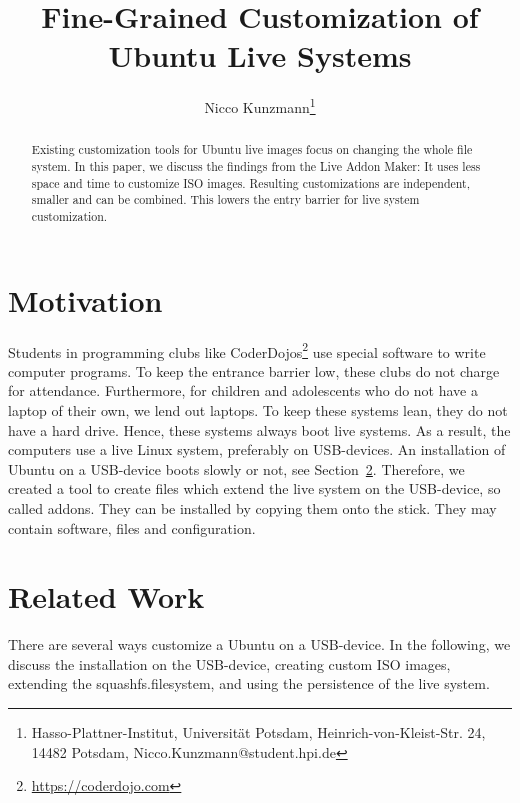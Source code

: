 \documentclass[english]{lni}
\author{Nicco Kunzmann\footnote{Hasso-Plattner-Institut, Universität Potsdam, Heinrich-von-Kleist-Str. 24, 14482 Potsdam, Nicco.Kunzmann@student.hpi.de} 
}
\title{Fine-Grained Customization of Ubuntu Live Systems}
\begin{document}
\maketitle
\renewcommand{\refname}{Literaturverzeichnis}
\setcounter{footnote}{2} %

\begin{abstract}
Existing customization tools for Ubuntu live images focus on changing the whole file system.
In this paper, we discuss the findings from the Live Addon Maker:
It uses less space and time to customize ISO images.
Resulting customizations are independent, smaller and can be combined.
This lowers the entry barrier for live system customization.
\end{abstract}
\begin{keywords}
\end{keywords}

\section{Motivation}

Students in programming clubs like CoderDojos\footnote{\url{https://coderdojo.com}} use special software to write computer programs.
To keep the entrance barrier low, these clubs do not charge for attendance.
Furthermore, for children and adolescents who do not have a laptop of their own, we lend out laptops. 
To keep these systems lean, they do not have a hard drive.
Hence, these systems always boot live systems.
As a result, the computers use a live Linux system, preferably on USB-devices.
An installation of Ubuntu on a USB-device boots slowly or not, see Section~\ref{sec:related}.
Therefore, we created a tool to create files which extend the live system on the  USB-device, so called addons.
They can be installed by copying them onto the stick.
They may contain software, files and configuration.

\section{Related Work}
\label{sec:related}

There are several ways customize a Ubuntu on a USB-device.
In the following, we discuss the installation on the USB-device, creating custom ISO images, extending the squashfs.filesystem, and using the persistence of the live system.
\end{document}
